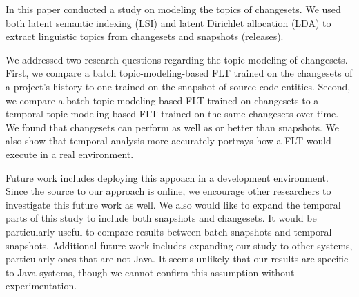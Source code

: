 
In this paper conducted a study on modeling the topics of changesets.
We used both latent semantic indexing (LSI) and latent Dirichlet
allocation (LDA) to extract linguistic topics from changesets and
snapshots (releases).

We addressed two research questions regarding the topic modeling of changesets.
First, we compare a batch topic-modeling-based FLT trained on the changesets
of a project's history to one trained on the snapshot of source code entities.
Second, we compare a batch topic-modeling-based FLT trained on changesets
to a temporal topic-modeling-based FLT trained on the same changesets over time.
We found that changesets can perform as well as or better than snapshots.
We also show that temporal analysis more accurately portrays how a FLT would execute in a real environment.


Future work includes deploying this appoach in a development environment.
Since the source to our approach is online, we encourage other researchers
to investigate this future work as well.
We also would like to expand the temporal parts of this study to include
both snapshots and changesets.
It would be particularly useful to compare results between batch snapshots and temporal snapshots.
Additional future work includes expanding our study to other systems,
particularly ones that are not Java.
It seems unlikely that our results are specific to Java systems,
though we cannot confirm this assumption without experimentation.


